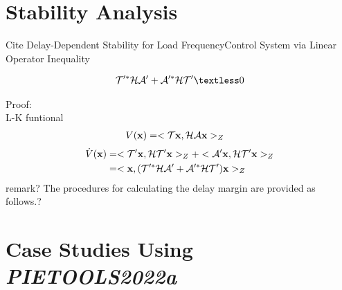 \documentclass[twocolumn]{autart}    %
\begin{document}
\section{Stability Analysis}
Cite Delay-Dependent Stability for Load FrequencyControl System via Linear Operator Inequality 

\begin{thm}
    \begin{equation}
        \begin{aligned}
            \setlength{\arraycolsep}{0.9pt}
            \mathcal{T}'^{*}\mathcal{H}\mathcal{A}'+\mathcal{A}'^{*}\mathcal{H}\mathcal{T}' \textless 0
        \end{aligned}
    \end{equation}
\end{thm}

Proof:\\
L-K funtional 
\begin{equation}
    \begin{aligned}
        \setlength{\arraycolsep}{0.9pt}
        V(\bold{x}) &= <\mathcal{T}\bold{x},\mathcal{H}\mathcal{A}\bold{x}>_{Z} 
    \end{aligned}
\end{equation}
\begin{equation}
    \begin{aligned}
        \setlength{\arraycolsep}{0.9pt}
        \dot{V}(\bold{x}) &= <\mathcal{T}'\bold{x},\mathcal{H}\mathcal{T}'\bold{x}>_{Z} + <\mathcal{A}'\bold{x},\mathcal{H}\mathcal{T}'\bold{x}>_{Z} \\ &=<\bold{x},(\mathcal{T}'^{*}\mathcal{H}\mathcal{A}'+\mathcal{A}'^{*}\mathcal{H}\mathcal{T}')\bold{x}>_{Z}  
    \end{aligned}
\end{equation}
remark?
The procedures for calculating the delay margin are provided as follows.?






\section{Case Studies Using \emph{PIETOOLS2022a}}
\end{document}
